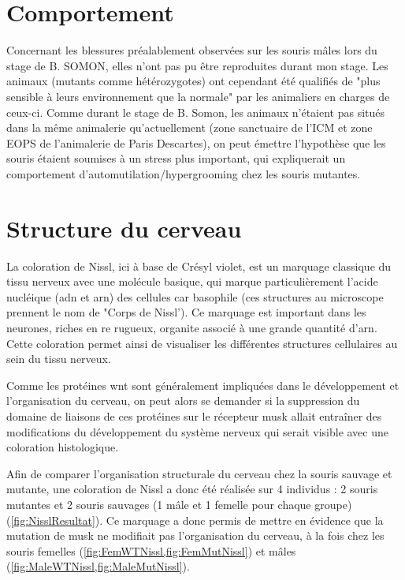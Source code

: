 \section{Comportement}
\label{sec:Comportement}
	Concernant les blessures préalablement observées sur les souris \mcrd mâles lors du stage de B. SOMON, elles n'ont pas pu être reproduites durant mon stage. Les animaux (mutants comme hétérozygotes) ont cependant été qualifiés de "plus sensible à leurs environnement que la normale" par les animaliers en charges de ceux-ci. Comme durant le stage de B. Somon, les animaux n'étaient pas situés dans la même animalerie qu'actuellement (zone sanctuaire de l'ICM et zone EOPS de l'animalerie de Paris Descartes), on peut émettre l'hypothèse que les souris étaient soumises à un stress plus important, qui expliquerait un comportement d'automutilation/hypergrooming chez les souris mutantes. 

\section{Structure du cerveau}
\label{sec:NisslResultat}
	La coloration de Nissl, ici à base de Crésyl violet, est un marquage classique du tissu nerveux avec une molécule basique, qui marque particulièrement l'acide nucléique (\acrshort{adn} et \acrshort{arn}) des cellules car basophile (ces structures au microscope prennent le nom de "Corps de Nissl'). Ce marquage est important dans les neurones, riches en \gls{re} rugueux, organite associé à une grande quantité d'\acrshort{arn}. Cette coloration permet ainsi de visualiser les différentes structures cellulaires au sein du tissu nerveux.

	Comme les protéines \gls{wnt} sont généralement impliquées dans le développement et l'organisation du cerveau, on peut alors se demander si la suppression du domaine de liaisons de ces protéines sur le récepteur \gls{musk} allait entraîner des modifications du développement du système nerveux qui serait visible avec une coloration histologique.

	Afin de comparer l'organisation structurale du cerveau chez la souris sauvage et mutante, une coloration de Nissl a donc été réalisée sur 4 individus : 2 souris mutantes et 2 souris sauvages (1 mâle et 1 femelle pour chaque groupe) (\cref{fig:NisslResultat}). Ce marquage a donc permis de mettre en évidence que la mutation de \gls{musk} ne modifiait pas l'organisation du cerveau, à la fois chez les souris femelles (\cref{fig:FemWTNissl,fig:FemMutNissl}) et mâles (\cref{fig:MaleWTNissl,fig:MaleMutNissl}). 

